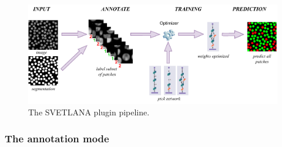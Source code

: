 \documentclass{article}
\begin{document}
\begin{figure}[htp!]
 \centering
 \includegraphics[width=\linewidth]{Figures/pipeline_svetlana.pdf}
  \caption{The SVETLANA plugin pipeline. \label{fig:pipeline}}
\end{figure}

\subsubsection{The annotation mode}
\end{document}
